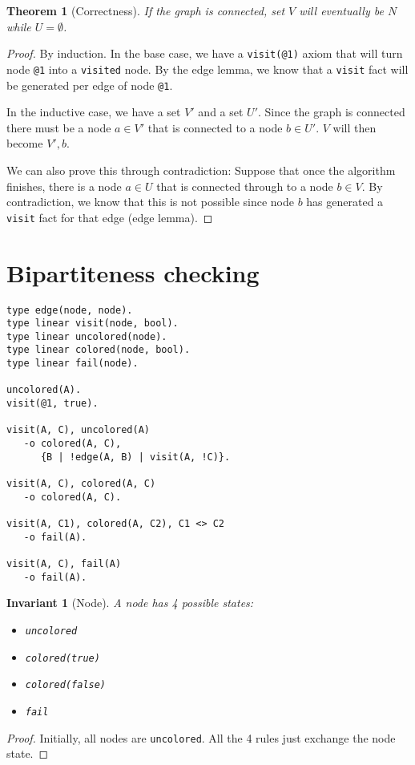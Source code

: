 \documentclass[9pt]{article}
\newtheorem{theorem}{Theorem}
\newtheorem{invariant}{Invariant}
\begin{document}
\begin{theorem}[Correctness]
If the graph is connected, set $V$ will eventually be $N$ while $U = \emptyset$.
\end{theorem}
\begin{proof}
By induction. In the base case,
we have a \texttt{visit(@1)} axiom that will turn node \texttt{@1} into a \texttt{visited} node.
By the edge lemma, we know that a \texttt{visit} fact will be generated per edge of node \texttt{@1}.

In the inductive case, we have a set $V'$ and a set $U'$. Since the graph is connected there must be a
node $a \in V'$ that is connected to a node $b \in U'$. $V$ will then become $V', b$.

We can also prove this through contradiction: Suppose that once the algorithm finishes, there is a node
$a \in U$ that is connected through to a node $b \in V$. By contradiction, we know that this is not
possible since node $b$ has generated a \texttt{visit} fact for that edge (edge lemma).
\end{proof}

\section{Bipartiteness checking}

\begin{verbatim}
type edge(node, node).
type linear visit(node, bool).
type linear uncolored(node).
type linear colored(node, bool).
type linear fail(node).

uncolored(A).
visit(@1, true).

visit(A, C), uncolored(A)
   -o colored(A, C),
      {B | !edge(A, B) | visit(A, !C)}.

visit(A, C), colored(A, C)
   -o colored(A, C).

visit(A, C1), colored(A, C2), C1 <> C2
   -o fail(A).

visit(A, C), fail(A)
   -o fail(A).
\end{verbatim}

\begin{invariant}[Node]
A node has 4 possible states:
\begin{itemize}
   \item \texttt{uncolored}
   \item \texttt{colored(true)}
   \item \texttt{colored(false)}
   \item \texttt{fail}
\end{itemize}
\end{invariant}
\begin{proof}
Initially, all nodes are \texttt{uncolored}. All the 4 rules just exchange the node state.
\end{proof}
\end{document}
